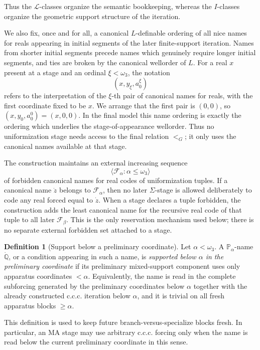 \documentclass[11pt]{article}
\theoremstyle{plain}
\theoremstyle{definition}
\newtheorem{definition}[theorem]{Definition}
\theoremstyle{remark}
\newcommand{\Pp}{\mathbb P}
\begin{document}
Thus the \(\mathcal L\)-classes organize the semantic bookkeeping, whereas the
\(I\)-classes organize the geometric support structure of the iteration.

We also fix, once and for all, a canonical $L$-definable ordering of all nice
names for reals appearing in initial segments of the later finite-support
iteration.  Names from shorter initial segments precede names which genuinely
require longer initial segments, and ties are broken by the canonical wellorder
of $L$.  For a real $x$ present at a stage and an ordinal $\xi<\omega_3$, the
notation
\[
(x,y_\xi,a^\xi_0)
\]
refers to the interpretation of the $\xi$-th pair of canonical names for reals,
with the first coordinate fixed to be $x$.  We arrange that the first pair is
$(0,0)$, so $(x,y_0,a^0_0)=(x,0,0)$.  In the final model this name ordering is
exactly the ordering which underlies the stage-of-appearance wellorder.  Thus no
uniformization stage needs access to the final relation $<_G$; it only uses the
canonical names available at that stage.

The construction maintains an external increasing sequence
\[
\langle\mathcal F_\alpha:\alpha\leq\omega_3\rangle
\]
of forbidden canonical names for real codes of uniformization tuples.  If a
canonical name $\dot z$ belongs to $\mathcal F_\alpha$, then no later
$\Sigma$-stage is allowed deliberately to code any real forced equal to
$\dot z$.  When a stage declares a tuple forbidden, the construction adds the
least canonical name for the recursive real code of that tuple to all later
$\mathcal F_\beta$.  This is the only reservation mechanism used below; there is
no separate external forbidden set attached to a stage.

\begin{definition}[Support below a preliminary coordinate]\label{def:support-below}
Let $\alpha<\omega_3$.  A $\Pp_\alpha$-name $\dot{\mathbb Q}$, or a condition
appearing in such a name, is \emph{supported below $\alpha$ in the preliminary
coordinate} if its preliminary mixed-support component uses only apparatus
coordinates $<\alpha$.  Equivalently, the name is read in the complete subforcing
generated by the preliminary coordinates below $\alpha$ together with the
already constructed c.c.c. iteration below $\alpha$, and it is trivial on all
fresh apparatus blocks $\geq\alpha$.
\end{definition}

This definition is used to keep future branch-versus-specialize blocks fresh.
In particular, an MA stage may use arbitrary c.c.c. forcing only when the name is
read below the current preliminary coordinate in this sense.
\end{document}
